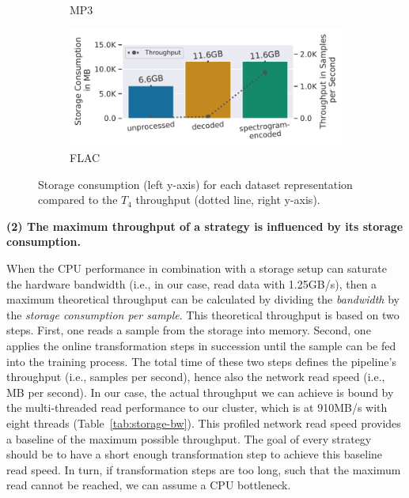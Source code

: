 {\begin{figure}[h]
\begin{subfigure}[c]{0.22\textwidth}
        \vspace{-18pt}
        \caption{MP3}
        \label{fig:ss-vs-thr-mp3}
    \end{subfigure}
    \begin{minipage}[c]{0.22\textwidth}
        \begin{subfigure}[c]{\textwidth}
            \includegraphics[width=\textwidth]{figures/librispeech-pipeline/storage-vs-throughput.pdf}
            \vspace{-18pt}
            \caption{FLAC}
            \label{fig:ss-vs-thr-flac}
        \end{subfigure}
    \end{minipage}\hspace{5mm}
    \begin{minipage}[c]{0.20\textwidth}
        \vspace{-10pt}
        \caption{Storage consumption (left y-axis) for each dataset representation compared to the $T_4$ throughput (dotted line, right y-axis).}
        \label{fig:ss-vs-thr}
    \end{minipage}
\end{figure}

\textbf{(2) The maximum throughput of a strategy is influenced by its storage consumption. }

When the CPU performance in combination with a storage setup can saturate the hardware bandwidth (i.e., in our case, read data with 1.25\:GB/s), then a maximum theoretical throughput can be calculated by dividing the \textit{bandwidth} by the \textit{storage consumption per sample}.
This theoretical throughput is based on two steps.
First, one reads a sample from the storage into memory.
Second, one applies the online transformation steps in succession until the sample can be fed into the training process.
The total time of these two steps defines the pipeline's throughput (i.e., samples per second), hence also the network read speed (i.e., MB per second).
In our case, the actual throughput we can achieve is bound by the multi-threaded read performance to our cluster, which is at 910MB/s with eight threads (Table~\ref{tab:storage-bw}).
This profiled network read speed provides a baseline of the maximum possible throughput.
The goal of every strategy should be to have a short enough transformation step to achieve this baseline read speed.
In turn, if transformation steps are too long, such that the maximum read cannot be reached, we can assume a CPU bottleneck.

}
